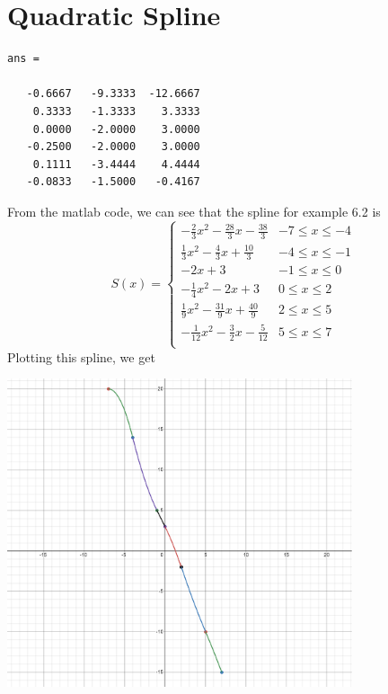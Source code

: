 \documentclass{article}
\begin{document}
\section*{Quadratic Spline}

\begin{verbatim}
ans =

   -0.6667   -9.3333  -12.6667
    0.3333   -1.3333    3.3333
    0.0000   -2.0000    3.0000
   -0.2500   -2.0000    3.0000
    0.1111   -3.4444    4.4444
   -0.0833   -1.5000   -0.4167
\end{verbatim}
From the matlab code, we can see that the spline for example 6.2 is
\[
	S(x) =
	\begin{cases}
		-\frac{2}{3}x^2 - \frac{28}{3}x - \frac{38}{3} & -7 \leq x \leq -4 \\
		\frac{1}{3}x^2 - \frac{4}{3}x + \frac{10}{3} & -4 \leq x \leq -1 \\
		-2x + 3 & -1 \leq x \leq 0 \\
		-\frac{1}{4}x^2 - 2x + 3 & 0 \leq x \leq 2 \\
		\frac{1}{9}x^2 - \frac{31}{9}x + \frac{40}{9} & 2 \leq x \leq 5 \\
		-\frac{1}{12}x^2 - \frac{3}{2}x - \frac{5}{12} & 5 \leq x \leq 7 \\
	\end{cases}
\]
Plotting this spline, we get 

\includegraphics[width=4in]{spline image.png}
\end{document}
